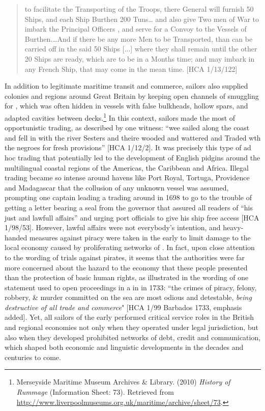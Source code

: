\begin{quotation}
to facilitate the Transporting of the Troops, there General will furnish 50 Ships, and each Ship Burthen 200 Tuns… and also give Two men of War to imbark the Principal Officers , and serve for a Convoy to the Vessels of Burthen.…And if there be any more Men to be Transported, than can be carried off in the said 50 Ships [...] where they shall remain until the other 20 Ships are ready, which are to be in a Months time; and may imbark in any French Ship, that may come in the mean time. [HCA 1/13/122]
\end{quotation}

In addition to legitimate maritime transit and commerce, sailors also supplied colonies and regions around Great Britain by keeping open channels of smuggling for , which was often hidden in vessels with false bulkheads, hollow spars, and adapted cavities between decks.\footnote{Merseyside Maritime Museum Archives \& Library. (2010)  \textit{History of Rummage} (Information Sheet: 73). Retrieved from \url{http://www.liverpoolmuseums.org.uk/maritime/archive/sheet/73}.} In this context, sailors made the most of opportunistic trading, as described by one witness: “wee sailed along the coast and fell in with the river Sesters and theire wooded and wattered and Traded wth the negroes for fresh provisions” [HCA 1/12/2]. It was precisely this type of ad hoc trading that potentially led to the development of English pidgins around the multilingual coastal regions of the Americas, the Caribbean and Africa. Illegal trading became so intense around  havens like Port Royal, Tortuga, Providence and Madagascar that the collusion of any unknown vessel was assumed, prompting one captain leading a trading  around  in 1698 to go to the trouble of getting a letter bearing a seal from the governor that assured all readers of “his just and lawfull affairs” and urging port officials to give his ship free access [HCA 1/98/53]. However, lawful affairs were not everybody’s intention, and heavy-handed measures against piracy were taken in the early  to limit damage to the local economy caused by proliferating networks of . In fact, upon close attention to the wording of trials against pirates, it seems that the authorities were far more concerned about the hazard to the economy that these people presented than the protection of basic human rights, as illustrated in the wording of one statement used to open proceedings in a  in  in 1733: “the crimes of piracy, felony, robbery, \& murder committed on the sea are most odious and detestable, \textit{being destructive of all trade and commerce}" [HCA 1/99 Barbados {1733}, emphasis added]. Yet, all sailors of the early  performed critical service roles in the British and regional economies not only when they operated under legal jurisdiction, but also when they developed prohibited networks of debt, credit and communication, which shaped both economic and linguistic developments in the decades and centuries to come. 

